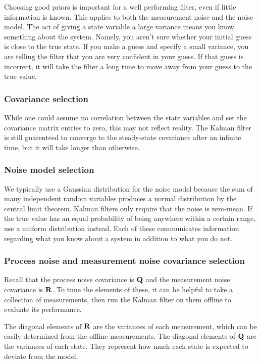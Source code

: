 Choosing good priors is important for a well performing filter, even if little
information is known. This applies to both the measurement noise and the noise
\gls{model}. The act of giving a \gls{state} variable a large variance means you
know something about the \gls{system}. Namely, you aren't sure whether your
initial guess is close to the true \gls{state}. If you make a guess and specify
a small variance, you are telling the filter that you are very confident in your
guess. If that guess is incorrect, it will take the filter a long time to move
away from your guess to the true value.

\subsubsection{Covariance selection}

While one could assume no correlation between the \gls{state} variables and set
the covariance matrix entries to zero, this may not reflect reality. The Kalman
filter is still guarenteed to converge to the steady-state covariance after an
infinite time, but it will take longer than otherwise.

\subsubsection{Noise model selection}

We typically use a Gaussian distribution for the noise \gls{model} because the
sum of many independent random variables produces a normal distribution by the
central limit theorem. Kalman filters only require that the noise is zero-mean.
If the true value has an equal probability of being anywhere within a certain
range, use a uniform distribution instead. Each of these communicates
information regarding what you know about a system in addition to what you do
not.

\subsubsection{Process noise and measurement noise covariance selection}

Recall that the process noise covariance is $\mathbf{Q}$ and the measurement noise
covariance is $\mathbf{R}$. To tune the elements of these, it can be helpful to
take a collection of measurements, then run the Kalman filter on them offline to
evaluate its performance.

The diagonal elements of $\mathbf{R}$ are the variances of each measurement, which
can be easily determined from the offline measurements. The diagonal elements of
$\mathbf{Q}$ are the variances of each \gls{state}. They represent how much each
\gls{state} is expected to deviate from the \gls{model}.

